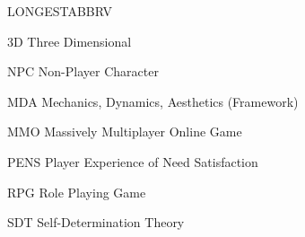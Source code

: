 \begin{theglossary}{LONGESTABBRV}

\item[3D] Three Dimensional
\item[NPC] Non-Player Character
\item[MDA] Mechanics, Dynamics, Aesthetics (Framework)
\item[MMO] Massively Multiplayer Online Game
\item[PENS] Player Experience of Need Satisfaction
\item[RPG] Role Playing Game
\item[SDT] Self-Determination Theory

\end{theglossary}
